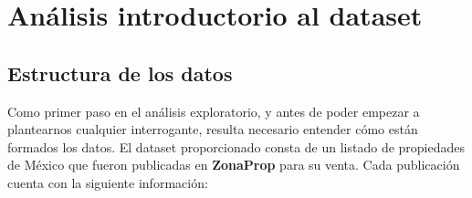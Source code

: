 \documentclass[
10pt, %
a4paper, %
oneside, %
headinclude,footinclude, %
BCOR5mm, %
]{scrartcl}
\begin{document}
\section{An\'alisis introductorio al dataset}

\subsection{Estructura de los datos}

Como primer paso en el an\'alisis exploratorio, y antes de poder empezar a plantearnos cualquier interrogante, resulta necesario entender c\'omo est\'an formados los datos. 
\vskip 2mm
El dataset proporcionado consta de un listado de propiedades de M\'exico que fueron publicadas en \textbf{ZonaProp} para su venta. Cada publicaci\'on cuenta con la siguiente informaci\'on:
\end{document}
